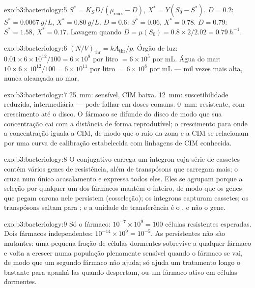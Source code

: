 \begin{solution}{exo:b3:bacteriology:5}
$S^{*} = K_{S}D/(\mu_{\max} - D)$, $X^{*} = Y(S_{0} - S^{*})$.
$D = 0.2$: $S^{*} = \qty{0.0067}{g/L}$, $X^{*} = \qty{0.80}{g/L}$.
$D = 0.6$: $S^{*} = 0.06$, $X^{*} = 0.78$. $D = 0.79$: $S^{*} = 1.58$,
$X^{*} = 0.17$. Lavagem quando
$D = \mu(S_{0}) = 0.8\times 2/2.02 = \qty{0.79}{h^{-1}}$.
\end{solution}

\begin{solution}{exo:b3:bacteriology:6}
$(N/V)_{\text{thr}} = kA_{\text{thr}}/p$. Órgão de luz: $0.01\times
6\times 10^{12}/100 = 6\times 10^{8}$ por litro $= 6\times 10^{5}$ por
mL. Água do mar: $10\times 6\times 10^{12}/100 = 6\times 10^{11}$ por
litro $= 6\times 10^{8}$ por mL --- mil vezes mais alta, nunca alcançada
no mar.
\end{solution}

\begin{solution}{exo:b3:bacteriology:7}
\qty{25}{mm}: sensível, CIM baixa. \qty{12}{mm}: suscetibilidade
reduzida, intermediária --- pode falhar em doses comuns. \qty{0}{mm}:
resistente, com crescimento até o disco. O fármaco se difunde do disco
de modo que sua concentração cai com a distância de forma
reprodutível; o crescimento para onde a concentração iguala a CIM, de
modo que o raio da zona e a CIM se relacionam por uma curva de
calibração estabelecida com linhagens de CIM conhecida.
\end{solution}

\begin{solution}{exo:b3:bacteriology:8}
O  conjugativo carrega um integron cuja série de cassetes
contém vários genes de resistência, além de transpósons que carregam
mais; o  cruza num único acasalamento e expressa todos eles.
Eles se agrupam porque a seleção por qualquer um dos fármacos mantém o
 inteiro, de modo que os genes que pegam carona nele persistem
(cosseleção); os integrons capturam cassetes; os transpósons saltam
para ; e a unidade de transferência é o , e não o
gene.
\end{solution}

\begin{solution}{exo:b3:bacteriology:9}
Só o fármaco: $10^{-7}\times 10^{9} = 100$ células resistentes
esperadas. Dois fármacos independentes: $10^{-14}\times 10^{9} = 10^{-5}$. As persistentes não são mutantes: uma pequena fração de
células dormentes sobrevive a qualquer fármaco e volta a crescer numa
população plenamente sensível quando o fármaco se vai, de modo que um
segundo fármaco não ajuda; só ajuda um tratamento longo o bastante para
apanhá-las quando despertam, ou um fármaco ativo em células dormentes.
\end{solution}

